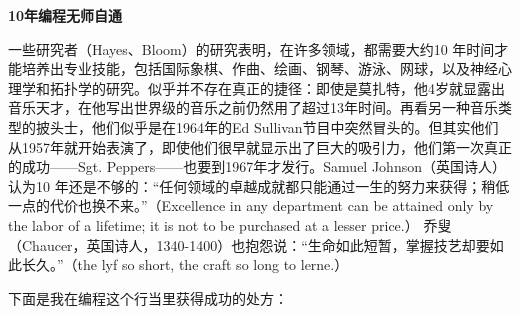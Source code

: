 \textbf{10年编程无师自通}


一些研究者（Hayes、Bloom）的研究表明，在许多领域，都需要大约10 年时间才能培养出专业技能，包括国际象棋、作曲、绘画、钢琴、游泳、网球，以及神经心理学和拓扑学的研究。似乎并不存在真正的捷径：即使是莫扎特，他4岁就显露出音乐天才，在他写出世界级的音乐之前仍然用了超过13年时间。再看另一种音乐类型的披头士，他们似乎是在1964年的Ed Sullivan节目中突然冒头的。但其实他们从1957年就开始表演了，即使他们很早就显示出了巨大的吸引力，他们第一次真正的成功——Sgt. Peppers——也要到1967年才发行。Samuel Johnson（英国诗人）认为10 年还是不够的：“任何领域的卓越成就都只能通过一生的努力来获得；稍低一点的代价也换不来。”（Excellence in any department can be attained only by the labor of a lifetime; it is not to be purchased at a lesser price.） 乔叟（Chaucer，英国诗人，1340-1400）也抱怨说：“生命如此短暂，掌握技艺却要如此长久。”（the lyf so short, the craft so long to lerne.）

下面是我在编程这个行当里获得成功的处方：

